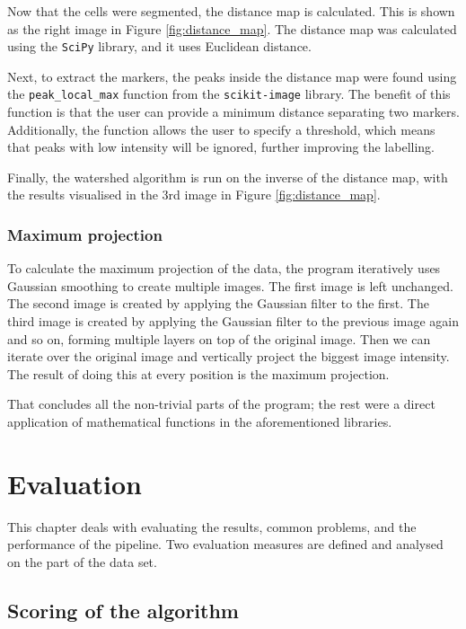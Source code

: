 \documentclass[
  digital,     %
  oneside,     %
  nosansbold,  %
  nocolorbold, %
  lof,         %
  lot,         %
]{fithesis4}
\begin{document}
Now that the cells were segmented, the distance map is calculated. This is shown
as the right image in Figure \ref{fig:distance_map}. The distance map was
calculated using the \texttt{SciPy} library, and it uses Euclidean distance.

Next, to extract the markers, the peaks inside the distance map were found using
the \texttt{peak\_local\_max} function from the \texttt{scikit-image} library. The benefit of
this function is that the user can provide a minimum distance separating two
markers. Additionally, the function allows the user to specify a threshold, which
means that peaks with low intensity will be ignored, further improving the
labelling.

Finally, the watershed algorithm is run on the inverse of the distance map, with the results
visualised in the 3rd image in Figure \ref{fig:distance_map}.

\subsection{Maximum projection} 
\label{sec:max-proj}
To calculate the maximum projection of the data, the program iteratively uses
Gaussian smoothing to create multiple images. The first image is left unchanged.
The second image is created by applying the Gaussian filter to the first. The
third image is created by applying the Gaussian filter to the previous image
again and so on, forming multiple layers on top of the original image. Then we can
iterate over the original image and vertically project the biggest image intensity.
The result of doing this at every position is the maximum projection.

That concludes all the non-trivial parts of the program; the rest were a direct
application of mathematical functions in the aforementioned libraries.

\clearpage
\chapter{Evaluation}
\label{chp:evaluation}
This chapter deals with evaluating the results, common problems, and the
performance of the pipeline. Two evaluation measures are defined and analysed on the part of
the data set.

\section{Scoring of the algorithm}
\end{document}
